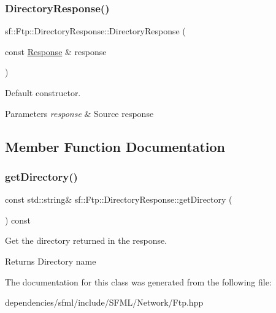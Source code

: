 \subsubsection{\texorpdfstring{Directory\+Response()}{DirectoryResponse()}}
{\footnotesize\ttfamily sf\+::\+Ftp\+::\+Directory\+Response\+::\+Directory\+Response (\begin{DoxyParamCaption}\item[{const \hyperlink{classsf_1_1_ftp_1_1_response}{Response} \&}]{response }\end{DoxyParamCaption})}



Default constructor. 


\begin{DoxyParams}{Parameters}
{\em response} & Source response \\
\hline
\end{DoxyParams}


\subsection{Member Function Documentation}
\mbox{\label{classsf_1_1_ftp_1_1_directory_response_a311575c5c50905219025acfa73de67e2}} 
\subsubsection{\texorpdfstring{get\+Directory()}{getDirectory()}}
{\footnotesize\ttfamily const std\+::string\& sf\+::\+Ftp\+::\+Directory\+Response\+::get\+Directory (\begin{DoxyParamCaption}{ }\end{DoxyParamCaption}) const}



Get the directory returned in the response. 

\begin{DoxyReturn}{Returns}
Directory name 
\end{DoxyReturn}


The documentation for this class was generated from the following file\+:\begin{DoxyCompactItemize}
\item 
dependencies/sfml/include/\+S\+F\+M\+L/\+Network/Ftp.\+hpp\end{DoxyCompactItemize}
